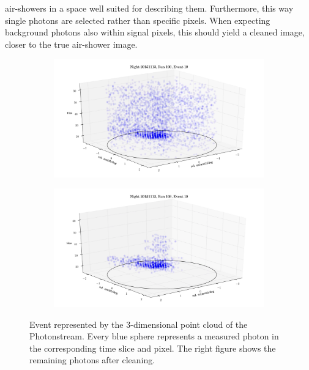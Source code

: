 air-showers in a space well suited for describing them. Furthermore, this way
single photons are selected rather than specific pixels. When expecting
background photons also within signal pixels, this should yield a cleaned image,
closer to the true air-shower image.
%
\begin{figure}
  \begin{subfigure}{0.5\textwidth}
    \includegraphics[width=1.1\textwidth]{Plots/event2.png}
  \end{subfigure}
  \begin{subfigure}{0.5\textwidth}
    \includegraphics[width=1.1\textwidth]{Plots/event1.png}
  \end{subfigure}
  \caption{Event represented by the 3-dimensional point cloud of the Photonstream. Every blue sphere represents a measured photon in the corresponding time slice and pixel. The right figure shows the remaining photons after cleaning.}
  \label{fig:event}
\end{figure}
%

